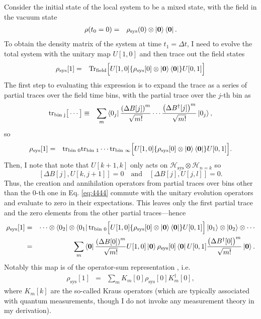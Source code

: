 \documentclass[%
 onecolumn,
 notitlepage,
 longbibliography,
 amsmath,amssymb,
 aps,
 pra,
 10pt,
]{revtex4-1}
\begin{document}
Consider the initial state of the local system to be a mixed state, with the field in the vacuum state
\begin{eqnarray}
\rho(t_0=0)&=&\rho_\text{sys}(0)\otimes\ket{\mathbf{0}}\bra{\mathbf{0}}.
\end{eqnarray}
To obtain the density matrix of the system at time $t_1=\Delta t$, I need to evolve the total system with the unitary map $U[1,0]$ and then trace out the field states
\begin{eqnarray}
\rho_\text{sys}[1]&=&\text{Tr}_\text{field}\Big[U[1,0]\{\rho_\text{sys}[0]\otimes\ket{\mathbf{0}}\bra{\mathbf{0}}\}U[0,1]\Big]\label{eq:43}
\end{eqnarray}
The first step to evaluating this expression is to expand the trace as a series of partial traces over the field time bins, with the partial trace over the $j$-th bin as
\begin{eqnarray}
\text{tr}_\text{bin j}\big[\cdots\big]&\equiv&\sum_m \bra{0_j}\frac{\left(\Delta B[j]\right)^m}{\sqrt{m!}} \cdots\frac{\left(\Delta B^\dagger[j]\right)^m}{\sqrt{m!}}\ket{0_j},
\end{eqnarray}
so
\begin{eqnarray}
\rho_\text{sys}[1]&=&\text{tr}_\text{bin 0}\text{tr}_\text{bin 1}\cdots\text{tr}_{\text{bin }\infty}\Big[U[1,0]\{\rho_\text{sys}[0]\otimes\ket{\mathbf{0}}\bra{\mathbf{0}}\}U[0,1]\Big].\label{eq:4444}
\end{eqnarray}
Then, I note that note that $U[k+1,k]$ only acts on $\mathcal{H}_\textrm{sys}\otimes\mathcal{H}_{n=k}$ so
\begin{equation}
\left[\Delta B[j],U[k,j+1]\right]=0\quad\textrm{and}\quad
\left[\Delta B[j],U[j,l]\right]=0.\label{eq:55}
\end{equation}
Thus, the creation and annihilation operators from partial traces over bins other than the $0$-th one in Eq. \ref{eq:4444} commute with the unitary evolution operators and evaluate to zero in their expectations. This leaves only the first partial trace and the zero elements from the other partial traces---hence
\begin{eqnarray}
\rho_\text{sys}[1]&=&\cdots\otimes\bra{0_2}\otimes\bra{0_1}\text{tr}_\text{bin 0}\Big[U[1,0]\{\rho_\text{sys}[0]\otimes\ket{\mathbf{0}}\bra{\mathbf{0}}\}U[0,1]\Big]\ket{0_1}\otimes\ket{0_2}\otimes\cdots\\
&=&\sum_m \bra{\mathbf{0}}\frac{\left(\Delta B[0]\right)^m}{\sqrt{m!}} U[1,0]\ket{\mathbf{0}}\rho_\text{sys}[0]\bra{\mathbf{0}}U[0,1]\frac{\left(\Delta B^\dagger[0]\right)^m}{\sqrt{m!}}\ket{\mathbf{0}}\label{eq:46}.
\end{eqnarray}
Notably this map is of the operator-sum representation \cite{jacobs2014quantum}, i.e.
\begin{eqnarray}
\rho_\text{sys}[1]&=&\sum_m K_{m}[0]\rho_\text{sys}[0]K_{m}^\dagger[0],\label{eq:47}
\end{eqnarray}
where $K_{m}[k]$ are the so-called Kraus operators (which are typically associated with quantum measurements, though I do not invoke any measurement theory in my derivation).
\end{document}
